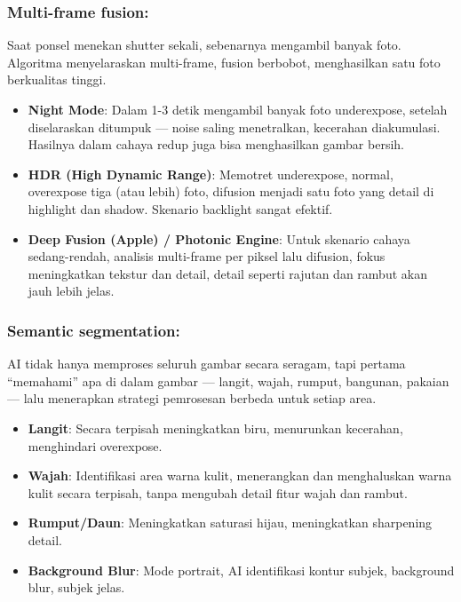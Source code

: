 \subsubsection*{Multi-frame fusion:}

Saat ponsel menekan shutter sekali, sebenarnya mengambil banyak foto. Algoritma menyelaraskan multi-frame, fusion berbobot, menghasilkan satu foto berkualitas tinggi.

\begin{itemize}
  \item \textbf{Night Mode}: Dalam 1-3 detik mengambil banyak foto underexpose, setelah diselaraskan ditumpuk — noise saling menetralkan, kecerahan diakumulasi. Hasilnya dalam cahaya redup juga bisa menghasilkan gambar bersih.
  \item \textbf{HDR (High Dynamic Range)}: Memotret underexpose, normal, overexpose tiga (atau lebih) foto, difusion menjadi satu foto yang detail di highlight dan shadow. Skenario backlight sangat efektif.
  \item \textbf{Deep Fusion (Apple) / Photonic Engine}: Untuk skenario cahaya sedang-rendah, analisis multi-frame per piksel lalu difusion, fokus meningkatkan tekstur dan detail, detail seperti rajutan dan rambut akan jauh lebih jelas.
\end{itemize}

\subsubsection*{Semantic segmentation:}

AI tidak hanya memproses seluruh gambar secara seragam, tapi pertama “memahami” apa di dalam gambar — langit, wajah, rumput, bangunan, pakaian — lalu menerapkan strategi pemrosesan berbeda untuk setiap area.

\begin{itemize}
  \item \textbf{Langit}: Secara terpisah meningkatkan biru, menurunkan kecerahan, menghindari overexpose.
  \item \textbf{Wajah}: Identifikasi area warna kulit, menerangkan dan menghaluskan warna kulit secara terpisah, tanpa mengubah detail fitur wajah dan rambut.
  \item \textbf{Rumput/Daun}: Meningkatkan saturasi hijau, meningkatkan sharpening detail.
  \item \textbf{Background Blur}: Mode portrait, AI identifikasi kontur subjek, background blur, subjek jelas.
\end{itemize}

